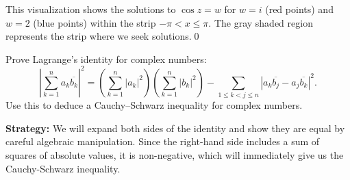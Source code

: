 This visualization shows the solutions to $\cos z = w$ for $w = i$ (red points) and $w = 2$ (blue points) within the strip $-\pi < x \leq \pi$. The gray shaded region represents the strip where we seek solutions.\qed


\begin{problembox}
Prove Lagrange's identity for complex numbers:
\[
\left| \sum_{k=1}^n a_k \overline{b_k} \right|^2 = \left( \sum_{k=1}^n |a_k|^2 \right) \left( \sum_{k=1}^n |b_k|^2 \right) - \sum_{1 \leq k < j \leq n} |a_k \overline{b_j} - a_j \overline{b_k}|^2.
\]
Use this to deduce a Cauchy–Schwarz inequality for complex numbers.
\end{problembox}

\noindent\textbf{Strategy:} We will expand both sides of the identity and show they are equal by careful algebraic manipulation. Since the right-hand side includes a sum of squares of absolute values, it is non-negative, which will immediately give us the Cauchy-Schwarz inequality.

